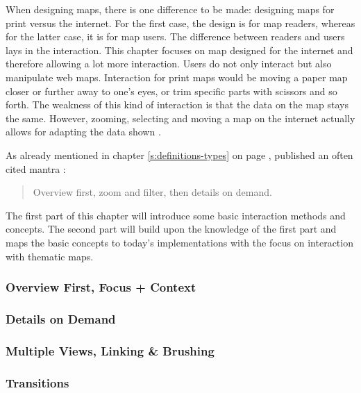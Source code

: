 When designing maps, there is one difference to be made: designing maps for print versus the internet. For the first case, the design is for map readers, whereas for the latter case, it is for map users. The difference between readers and users lays in the interaction. This chapter focuses on map designed for the internet and therefore allowing a lot more interaction. Users do not only interact but also manipulate web maps. Interaction for print maps would be moving a paper map closer or further away to one's eyes, or trim specific parts with scissors and so forth. The weakness of this kind of interaction is that the data on the map stays the same. However, zooming, selecting and moving a map on the internet actually allows for adapting the data shown .

As already mentioned in chapter \ref{s:definitions-types} on page \pageref{s:definitions-types}, \citeauthor{Shneiderman1996} published an often cited mantra :
\begin{quote}
Overview first, zoom and filter, then details on demand.
\end{quote}



The first part of this chapter will introduce some basic interaction methods and concepts. The second part will build upon the knowledge of the first part and maps the basic concepts to today's implementations with the focus on interaction with thematic maps.

\subsubsection{Overview First, Focus + Context}


\subsubsection{Details on Demand}


\subsubsection{Multiple Views, Linking \& Brushing}


\subsubsection{Transitions}


